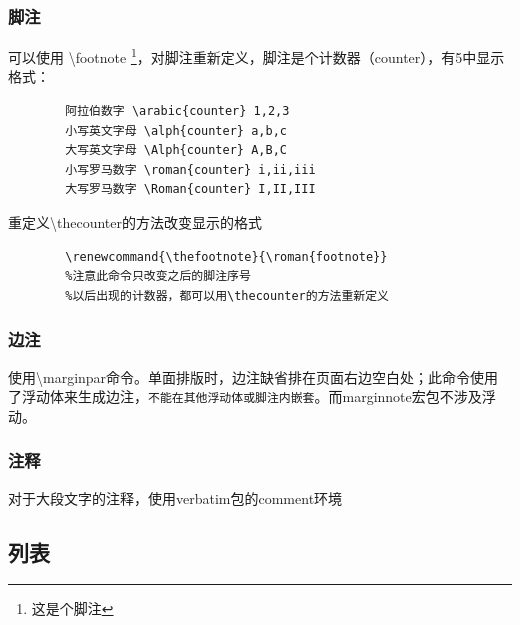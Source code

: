 \documentclass[16pt]{article}
\begin{document}
\subsubsection{脚注}
可以使用 \textbackslash footnote \footnote{这是个脚注}，对脚注重新定义，脚注是个计数器（counter），有5中显示格式：
\begin{lstlisting}
        阿拉伯数字 \arabic{counter} 1,2,3
        小写英文字母 \alph{counter} a,b,c
        大写英文字母 \Alph{counter} A,B,C
        小写罗马数字 \roman{counter} i,ii,iii
        大写罗马数字 \Roman{counter} I,II,III
    \end{lstlisting}
\par
重定义\textbackslash thecounter的方法改变显示的格式
\begin{lstlisting}
        \renewcommand{\thefootnote}{\roman{footnote}} 
        %注意此命令只改变之后的脚注序号
        %以后出现的计数器，都可以用\thecounter的方法重新定义
    \end{lstlisting}

\subsubsection{边注}
使用\textbackslash marginpar命令。单面排版时，边注缺省排在页面右边空白处；此命令使用了浮动体来生成边注，\texttt{不能在其他浮动体或脚注内嵌套}。而marginnote宏包不涉及浮动。

\subsubsection{注释}
对于大段文字的注释，使用verbatim包的comment环境

\subsection{列表}
\end{document}
